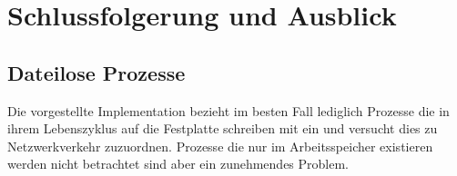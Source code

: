 \chapter{Schlussfolgerung und Ausblick}%
\label{cha:conclusion}


\section{Dateilose Prozesse}
Die vorgestellte Implementation bezieht im besten Fall lediglich Prozesse die in ihrem Lebenszyklus auf die Festplatte schreiben mit ein und versucht dies zu Netzwerkverkehr zuzuordnen. Prozesse die nur im Arbeitsspeicher existieren werden nicht betrachtet sind aber ein zunehmendes Problem.
